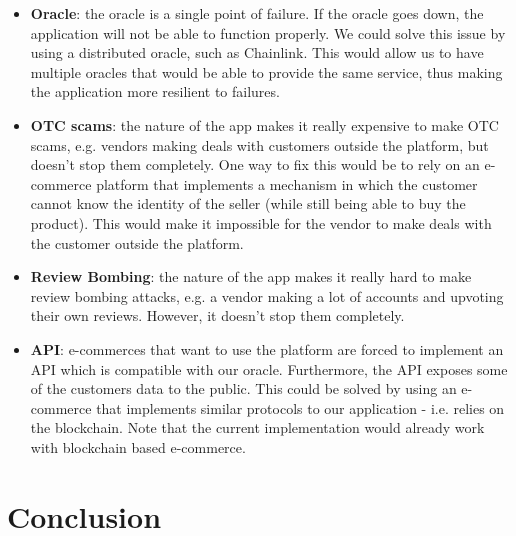 \documentclass[12pt,a4paper,oneside]{article}
\theoremstyle{definition}
\begin{document}
\begin{itemize}
	\item {\bf{Oracle}}: the oracle is a single point of failure. If the oracle goes down, the application will not be able to function properly. We could solve this issue by using a distributed oracle, such as Chainlink. This would allow us to have multiple oracles that would be able to provide the same service, thus making the application more resilient to failures.
	\item {\bf{OTC scams}}: the nature of the app makes it really expensive to make OTC scams, e.g. vendors making deals with customers outside the platform, but doesn't stop them completely. One way to fix this would be to rely on an e-commerce platform that implements a mechanism in which the customer cannot know the identity of the seller (while still being able to buy the product). This would make it impossible for the vendor to make deals with the customer outside the platform.
	\item {\bf{Review Bombing}}: the nature of the app makes it really hard to make review bombing attacks, e.g. a vendor making a lot of accounts and upvoting their own reviews. However, it doesn't stop them completely.
	\item {\bf{API}}: e-commerces that want to use the platform are forced to implement an API which is compatible with our oracle. Furthermore, the API exposes some of the customers data to the public. This could be solved by using an e-commerce that implements similar protocols to our application - i.e. relies on the blockchain. Note that the current implementation would already work with blockchain based e-commerce.
\end{itemize}

\section{Conclusion}

\newpage
\end{document}
